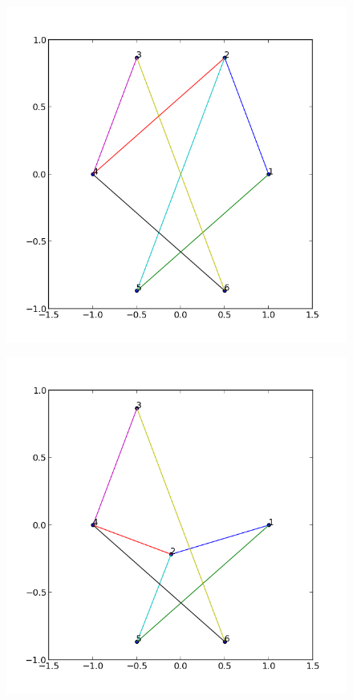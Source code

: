 \documentclass[12pt,a4paper]{article}
\begin{document}
\begin{figure}
			\begin{minipage}[b]{.24\textwidth}
			\centering
			\includegraphics[width=1.\textwidth]{ex1p0}\\
			\end{minipage}\hfill
			\begin{minipage}[b]{.24\textwidth}
			\centering
			\includegraphics[width=1.\textwidth]{ex1p1}\\

\end{minipage}
\end{figure}
\end{document}
